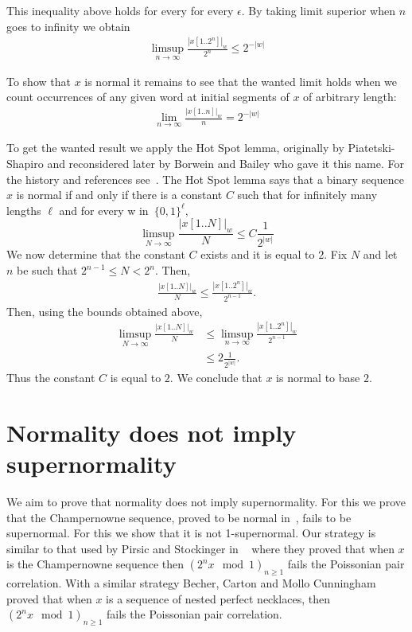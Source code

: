 \documentclass[11pt,a4paper]{tesis}
\begin{document}
This  inequality above holds for every  for every $\epsilon$. By taking limit superior when $n$ goes to infinity we obtain 
\begin{align*}
\limsup_{n\to \infty}\frac{|x[1.. 2^n]|_w }{ 2^n} \leq {2^{-|w|}}
\end{align*}


To show that $x$ is normal it remains to see that the wanted 
limit holds when we count occurrences of any given word at initial segments of $x$ of arbitrary length:
\begin{align*}
\lim_{n\to \infty}\frac{|x[1.. n]|_w }{ n}= {2^{-|w|}}
\end{align*}

To get the wanted result we apply the  Hot Spot lemma, originally by Piatetski-Shapiro  and reconsidered 
later by Borwein and Bailey \cite{hotspot}  who gave it this name. For  the history and references see~\cite[Theorem 7.4.1]{BC2018}.
The Hot Spot lemma says that a binary sequence $x$ is normal if and only if there is a constant $C$ 
such that for infinitely many lengths $\ell$ and for every w in~$\{0,1\}^\ell$,
    $$\limsup_{N\to \infty}  \frac{|x[1.. N]|_w }{N} \leq C \frac{1}{2^{|w|}}$$
 We now determine that the constant $C$ exists and it is equal to $2$.
Fix $N$ and let $n$ be such that $2^{n-1}\leq N<2^{n}$. 
Then,
\begin{align*}
\frac{{|x[1.. N]|_w }}{N}\leq \frac{{|x[1.. 2^{n}]|_w }}{2^{n-1}}.
\end{align*}
Then, using the bounds obtained above,
\begin{align*}
\limsup_{N\to \infty}  \frac{|x[1.. N]|_w }{N} 
&\leq \limsup_{n\to \infty}\frac{{|x[1.. 2^{n}]|_w }}{2^{n-1}}\\
&\leq 2\frac{1}{2^{|w|}}.
\end{align*}
Thus the constant $C$ is equal to $2$.
We conclude that $x$ is normal to base $2$.
\pagebreak

\section{Normality does not imply supernormality}
We aim to prove that normality does not imply supernormality. 
For this we prove that the Champernowne sequence, proved to be normal in~\cite{champern}, 
fails to be supernormal. For this we show that  it is not 1-supernormal.
Our strategy is similar to that used by Pirsic and Stockinger in ~\cite{PS2019}  where they proved that when $x$ is 
the Champernowne 
sequence then $(2^n x \mod 1)_{n\geq 1}$ fails the Poissonian pair correlation.
With a similar strategy  Becher, Carton and Mollo Cunningham ~\cite{BCC2019}
 proved that when $x$ is a sequence of nested perfect necklaces, then $(2^n x \mod 1)_{n\geq 1}$ fails the Poissonian pair correlation.
\end{document}
